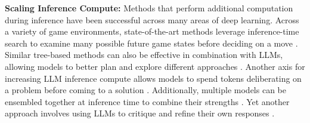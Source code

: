 \documentclass[11pt]{article}
\begin{document}
\textbf{Scaling Inference Compute:} Methods that perform additional computation during inference have been successful across many areas of deep learning. Across a variety of game environments, state-of-the-art methods leverage inference-time search to examine many possible future game states before deciding on a move \cite{deepblue, silver2017mastering, pluribus}. Similar tree-based methods can also be effective in combination with LLMs, allowing models to better plan and explore different approaches \cite{yao2023treethoughtsdeliberateproblem, Besta_2024, tian2024selfimprovementllmsimaginationsearching, Trinh2024alphageometry}. Another axis for increasing LLM inference compute allows models to spend tokens deliberating on a problem before coming to a solution \cite{yao2022reactsynergizingreasoningacting, wei2023chainofthought, zelikman2024quietstarlanguagemodelsteach}. Additionally, multiple models can be ensembled together at inference time to combine their strengths \cite{wang2024mixtureofagentsenhanceslargelanguage, chen2024llmcallsneedscaling, ong2024routellmlearningroutellms, wan2024knowledgefusionlargelanguage, jiang2023llmblenderensemblinglargelanguage}. Yet another approach involves using LLMs to critique and refine their own responses \cite{madaan2023selfrefineiterativerefinementselffeedback, bai2022constitutional}.

\;
\end{document}
